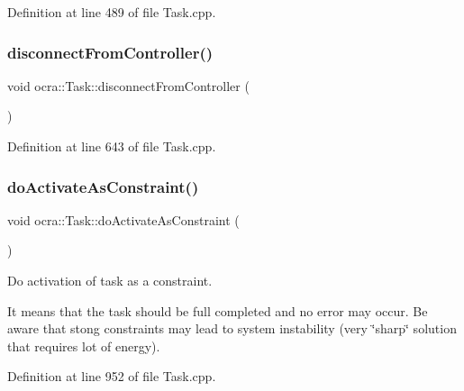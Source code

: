 Definition at line 489 of file Task.\+cpp.

\hypertarget{classocra_1_1Task_a3d780dc6817552070f3d5570a9052e3f}{}\label{classocra_1_1Task_a3d780dc6817552070f3d5570a9052e3f} 
\subsubsection{\texorpdfstring{disconnect\+From\+Controller()}{disconnectFromController()}}
{\footnotesize\ttfamily void ocra\+::\+Task\+::disconnect\+From\+Controller (\begin{DoxyParamCaption}{ }\end{DoxyParamCaption})}



Definition at line 643 of file Task.\+cpp.

\hypertarget{classocra_1_1Task_ae1d786b51c24d56c4e2d800e422ebc75}{}\label{classocra_1_1Task_ae1d786b51c24d56c4e2d800e422ebc75} 
\subsubsection{\texorpdfstring{do\+Activate\+As\+Constraint()}{doActivateAsConstraint()}}
{\footnotesize\ttfamily void ocra\+::\+Task\+::do\+Activate\+As\+Constraint (\begin{DoxyParamCaption}{ }\end{DoxyParamCaption})\hspace{0.3cm}{\ttfamily [protected]}}

Do activation of task as a constraint.

It means that the task should be full completed and no error may occur. Be aware that stong constraints may lead to system instability (very \char`\"{}sharp\char`\"{} solution that requires lot of energy). 

Definition at line 952 of file Task.\+cpp.

\hypertarget{classocra_1_1Task_ac5b5ad719f9a34bdc0a275804b4c50f3}{}\label{classocra_1_1Task_ac5b5ad719f9a34bdc0a275804b4c50f3} 
